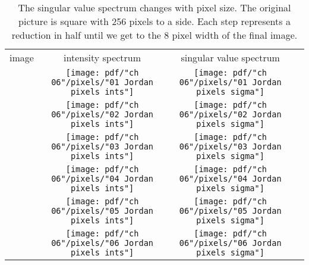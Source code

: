 \begin{table}[htdp]
\begin{center}
\begin{tabular}{cccc}
 image & intensity spectrum & singular value spectrum \\
\includegraphics[ width = 1.1in ] {pdf/"ch 06"/pixels/"01 Jordan pixels image"} &
\texttt{[image: pdf/"ch 06"/pixels/"01 Jordan pixels ints"]} &
\texttt{[image: pdf/"ch 06"/pixels/"01 Jordan pixels sigma"]} \\
%
\includegraphics[ width = 1.1in ] {pdf/"ch 06"/pixels/"02 Jordan pixels image"} &
\texttt{[image: pdf/"ch 06"/pixels/"02 Jordan pixels ints"]} &
\texttt{[image: pdf/"ch 06"/pixels/"02 Jordan pixels sigma"]} \\
%
\includegraphics[ width = 1.1in ] {pdf/"ch 06"/pixels/"03 Jordan pixels image"} &
\texttt{[image: pdf/"ch 06"/pixels/"03 Jordan pixels ints"]} &
\texttt{[image: pdf/"ch 06"/pixels/"03 Jordan pixels sigma"]} \\
%
\includegraphics[ width = 1.1in ] {pdf/"ch 06"/pixels/"04 Jordan pixels image"} &
\texttt{[image: pdf/"ch 06"/pixels/"04 Jordan pixels ints"]} &
\texttt{[image: pdf/"ch 06"/pixels/"04 Jordan pixels sigma"]} \\
%
\includegraphics[ width = 1.1in ] {pdf/"ch 06"/pixels/"05 Jordan pixels image"} &
\texttt{[image: pdf/"ch 06"/pixels/"05 Jordan pixels ints"]} &
\texttt{[image: pdf/"ch 06"/pixels/"05 Jordan pixels sigma"]} \\
%
\includegraphics[ width = 1.1in ] {pdf/"ch 06"/pixels/"06 Jordan pixels image"} &
\texttt{[image: pdf/"ch 06"/pixels/"06 Jordan pixels ints"]} &
\texttt{[image: pdf/"ch 06"/pixels/"06 Jordan pixels sigma"]} \\
\end{tabular}
\end{center}
\caption[The singular value spectrum changes with pixel size]{The singular value spectrum changes with pixel size. The original picture is square with 256 pixels to a side. Each step represents a reduction in half until we get to the 8 pixel width of the final image.	}
\label{tab:Jordan:pixels}
\end{table}%


\endinput